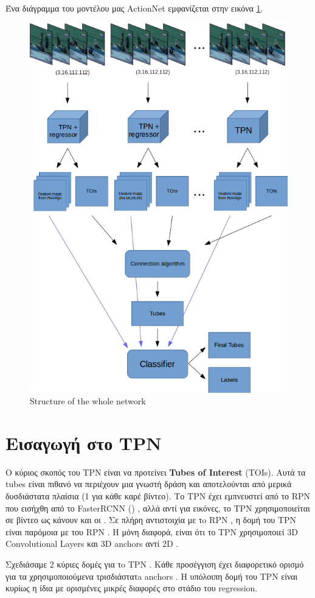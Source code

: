 \documentclass{report}
\begin{document}
Ένα διάγραμμα του μοντέλου μας ActionNet εμφανίζεται στην εικόνα \ref{fig:whole_network_}. 
\begin{figure}[h]
  \centering
  \includegraphics[scale=0.42]{model_prenms}
  \caption{Structure of the whole network}
  \label{fig:whole_network_}
\end{figure}

\section{Εισαγωγή στο  TPN}
Ο κύριος σκοπός του   TPN   είναι να προτείνει \textbf{Tubes of Interest} (TOIs). Αυτά τα   tubes   είναι πιθανό να περιέχουν μια γνωστή δράση και αποτελούνται από μερικά
δυσδιάστατα πλαίσια (1 για κάθε καρέ βίντεο). Το   TPN   έχει εμπνευστεί από το   RPN   που εισήχθη από το    FasterRCNN (\cite{Ren:2015:FRT:2969239.2969250}) ,
αλλά αντί για εικόνες, το   TPN   χρησιμοποιείται σε βίντεο ως κάνουν και οι  \cite{DBLP:journals/corr/HouCS17} . Σε πλήρη αντιστοιχία με τo   RPN  , η δομή
του   TPN   είναι παρόμοια με του   RPN . Η μόνη διαφορά, είναι ότι το   TPN   χρησιμοποιεί   3D Convolutional Layers   και   3D anchors   αντί   2D  .  \par
Σχεδιάσαμε 2 κύριες δομές για τo   TPN . Κάθε προσέγγιση έχει διαφορετικό ορισμό για τα χρησιμοποιούμενα τρισδιάστατa   anchors . 
Η υπόλοιπη δομή του   TPN   είναι κυρίως η ίδια με ορισμένες μικρές διαφορές στο στάδιο του    regression.   \par
\end{document}
